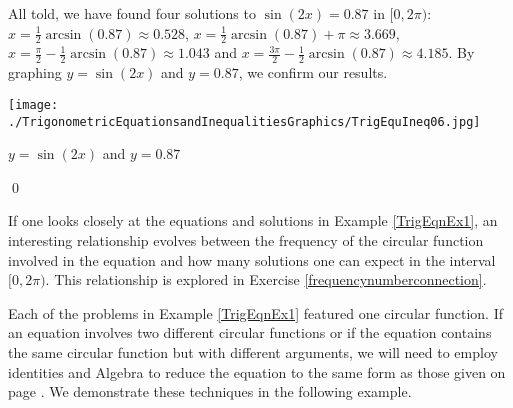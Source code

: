 \documentclass{ximera}
\begin{document}
\begin{example}
\begin{enumerate}
 \smallskip
 
All told, we have found four solutions to $\sin(2x) = 0.87$ in $[0,2\pi)$:  $x =\frac{1}{2} \arcsin(0.87) \approx 0.528$, $x=\frac{1}{2} \arcsin(0.87) + \pi \approx 3.669$, $x =\frac{\pi}{2} -  \frac{1}{2}\arcsin(0.87) \approx 1.043$ and  $x = \frac{3\pi}{2} - \frac{1}{2}\arcsin(0.87) \approx 4.185$. By graphing $y = \sin(2x)$ and $y = 0.87$, we confirm our results.



\begin{center}


  \texttt{[image: ./TrigonometricEquationsandInequalitiesGraphics/TrigEquIneq06.jpg]} 

{\boldmath $y = \sin(2x)$} and  $y = 0.87$


\end{center} 

\end{enumerate}

\vspace*{-.3in} \qed

\end{example}


If one looks closely at the equations and solutions in Example \ref{TrigEqnEx1}, an interesting relationship evolves between the frequency of the circular function involved in the equation and how many solutions one can expect in the interval $[0, 2\pi)$.   This relationship is explored in Exercise \ref{frequencynumberconnection}.

\smallskip

Each of the problems in Example \ref{TrigEqnEx1} featured one circular function.  If an equation involves two different circular functions or if the equation contains the same circular function but with different arguments, we will need to employ identities and Algebra to reduce the equation to the same form as those given on page  \pageref{trigeqnstrategy1}.  We demonstrate these techniques in the following example.
 
\end{document}
